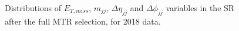\begin{figure}[htbp]
{    }
  \caption{Distributions of $E_{T,miss}$, $m_{jj}$, $\Delta\eta_{jj}$ and $\Delta\phi_{jj}$ variables in the SR after the full MTR selection, for 2018 data.}
  \label{fig:2018_SR_motivation_1}
\end{figure}





